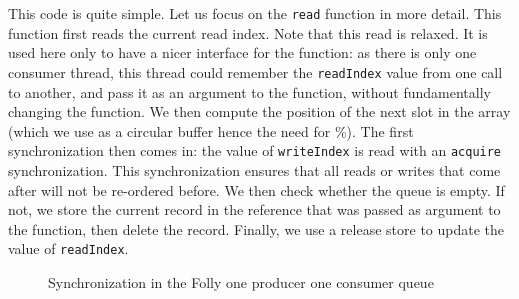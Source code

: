 This code is quite simple. Let us focus on the \texttt{read} function in more detail. This function first reads the current read index. Note that this read is relaxed. It is used here only to have a nicer interface for the function: as there is only one consumer thread, this thread could remember the \texttt{readIndex} value from one call to another, and pass it as an argument to the function, without fundamentally changing the function. We then compute the position of the next slot in the array (which we use as a circular buffer hence the need for \%). The first synchronization then comes in: the value of \texttt{writeIndex} is read with an \texttt{acquire} synchronization. This synchronization ensures that all reads or writes that come after will not be re-ordered before. We then check whether the queue is empty. If not, we store the current record in the reference that was passed as argument to the function, then delete the record. Finally, we use a release store to update the value of \texttt{readIndex}.

\begin{figure}
		\begin{center}
\end{center}
\caption{Synchronization in the Folly one producer one consumer queue}

\label{fig:synchQueue}
\end{figure}


